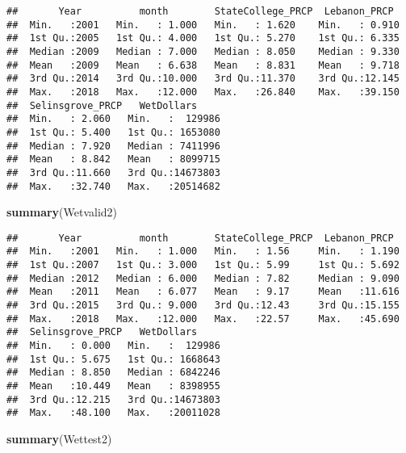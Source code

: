 \documentclass[]{article}
\newenvironment{Shaded}{\begin{snugshade}}{\end{snugshade}}
\newcommand{\KeywordTok}[1]{\textcolor[rgb]{0.13,0.29,0.53}{\textbf{{#1}}}}
\newcommand{\NormalTok}[1]{{#1}}
\begin{document}
\begin{verbatim}
##       Year          month        StateCollege_PRCP  Lebanon_PRCP   
##  Min.   :2001   Min.   : 1.000   Min.   : 1.620    Min.   : 0.910  
##  1st Qu.:2005   1st Qu.: 4.000   1st Qu.: 5.270    1st Qu.: 6.335  
##  Median :2009   Median : 7.000   Median : 8.050    Median : 9.330  
##  Mean   :2009   Mean   : 6.638   Mean   : 8.831    Mean   : 9.718  
##  3rd Qu.:2014   3rd Qu.:10.000   3rd Qu.:11.370    3rd Qu.:12.145  
##  Max.   :2018   Max.   :12.000   Max.   :26.840    Max.   :39.150  
##  Selinsgrove_PRCP   WetDollars      
##  Min.   : 2.060   Min.   :  129986  
##  1st Qu.: 5.400   1st Qu.: 1653080  
##  Median : 7.920   Median : 7411996  
##  Mean   : 8.842   Mean   : 8099715  
##  3rd Qu.:11.660   3rd Qu.:14673803  
##  Max.   :32.740   Max.   :20514682
\end{verbatim}

\begin{Shaded}
\begin{Highlighting}[]
\KeywordTok{summary}\NormalTok{(Wetvalid2)}
\end{Highlighting}
\end{Shaded}

\begin{verbatim}
##       Year          month        StateCollege_PRCP  Lebanon_PRCP   
##  Min.   :2001   Min.   : 1.000   Min.   : 1.56     Min.   : 1.190  
##  1st Qu.:2007   1st Qu.: 3.000   1st Qu.: 5.99     1st Qu.: 5.692  
##  Median :2012   Median : 6.000   Median : 7.82     Median : 9.090  
##  Mean   :2011   Mean   : 6.077   Mean   : 9.17     Mean   :11.616  
##  3rd Qu.:2015   3rd Qu.: 9.000   3rd Qu.:12.43     3rd Qu.:15.155  
##  Max.   :2018   Max.   :12.000   Max.   :22.57     Max.   :45.690  
##  Selinsgrove_PRCP   WetDollars      
##  Min.   : 0.000   Min.   :  129986  
##  1st Qu.: 5.675   1st Qu.: 1668643  
##  Median : 8.850   Median : 6842246  
##  Mean   :10.449   Mean   : 8398955  
##  3rd Qu.:12.215   3rd Qu.:14673803  
##  Max.   :48.100   Max.   :20011028
\end{verbatim}

\begin{Shaded}
\begin{Highlighting}[]
\KeywordTok{summary}\NormalTok{(Wettest2)}
\end{Highlighting}
\end{Shaded}
\end{document}
